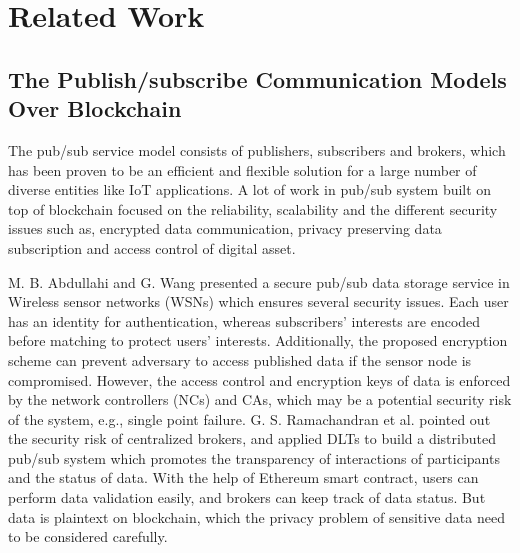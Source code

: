 \documentclass[conference]{IEEEtran}
\begin{document}
\section{Related Work}
\label{section:relatedWork}
\subsection{The Publish/subscribe Communication Models Over Blockchain}
The pub/sub service model consists of publishers, subscribers and brokers, which has been proven\cite{pubSubAnalysis, pubSubAnalysis2} to be an efficient and flexible solution for a large number of diverse entities like IoT applications. A lot of work in pub/sub system built on top of blockchain focused on the reliability, scalability and the different security issues such as, encrypted data communication, privacy preserving data subscription and access control of digital asset. 

M. B. Abdullahi and G. Wang\cite{centralPubSub} presented a secure pub/sub data storage service in Wireless sensor networks (WSNs) which ensures several security issues. Each user has an identity for authentication, whereas subscribers' interests are encoded before matching to protect users' interests. Additionally, the proposed encryption scheme can prevent adversary to access published data if the sensor node is compromised. However, the access control and encryption keys of data is enforced by the network controllers (NCs) and CAs, which may be a potential security risk of the system, e.g., single point failure. G. S. Ramachandran et al.\cite{trinity} pointed out the security risk of centralized brokers, and applied DLTs to build a distributed pub/sub system which promotes the transparency of interactions of participants and the status of data. With the help of Ethereum smart contract, users can perform data validation easily, and brokers can keep track of data status. But data is plaintext on blockchain, which the privacy problem of sensitive data need to be considered carefully.
\end{document}
